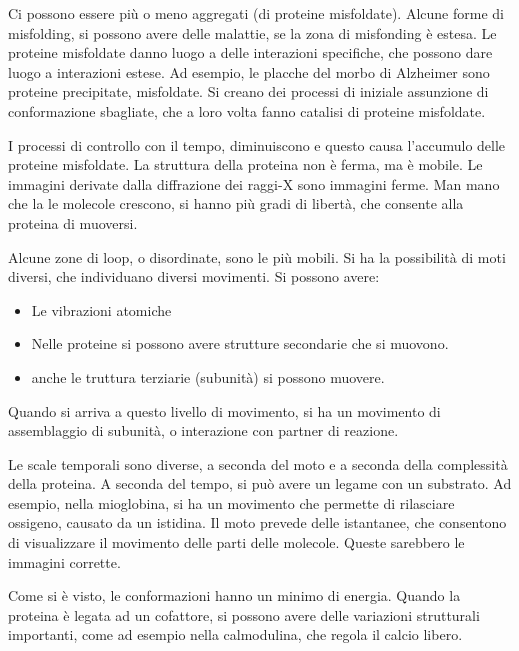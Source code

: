 Ci possono essere più o meno aggregati (di proteine misfoldate). Alcune
forme di misfolding, si possono avere delle malattie, se la zona di
misfonding è estesa. Le proteine misfoldate danno
luogo a delle interazioni specifiche, che possono dare luogo a
interazioni estese.
Ad esempio, le placche del morbo di Alzheimer sono proteine precipitate, misfoldate.
Si creano dei processi di iniziale assunzione di conformazione
sbagliate, che a loro volta fanno catalisi di proteine misfoldate.


I processi di controllo con il tempo, diminuiscono e questo causa
l'accumulo delle proteine misfoldate.
La struttura della proteina non è ferma, ma è mobile. Le immagini
derivate dalla diffrazione dei raggi-X sono immagini ferme. Man mano che
la le molecole crescono, si hanno più gradi di libertà, che consente
alla proteina di muoversi.

Alcune zone di loop, o disordinate, sono le più mobili. Si ha la
possibilità di moti diversi, che individuano diversi movimenti.
Si possono avere:
\begin{itemize}
  \item Le vibrazioni atomiche
  \item Nelle proteine si possono avere strutture secondarie che si muovono. 
  \item anche le truttura terziarie (subunità) si possono muovere.
\end{itemize}
Quando si arriva a questo livello di movimento, si ha un movimento di
assemblaggio di subunità, o interazione con partner di reazione.

Le scale temporali sono diverse, a seconda del moto e a seconda della
complessità della proteina. A seconda del tempo, si può avere un legame
con un substrato.
Ad esempio, nella mioglobina, si ha un movimento che permette di
rilasciare ossigeno, causato da un istidina. Il moto prevede delle
istantanee, che consentono di visualizzare il movimento delle parti
delle molecole. Queste sarebbero le immagini corrette.

Come si è visto, le conformazioni hanno un minimo di energia. Quando la
proteina è legata ad un cofattore, si possono avere delle variazioni
strutturali importanti, come ad esempio nella calmodulina, che regola il
calcio libero.

